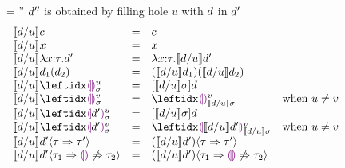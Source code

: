 
\begin{figure}
\small
\judgbox
  { = \dexp''}
  {$d''$ is obtained by filling hole $u$ with $d$ in $d'$}
\[
\begin{array}{lcll}
\instantiate{\dexp}{u}{c}
&=&
c\\
{\instantiate{\dexp}{u}{x}}
&=&
x\\
{\instantiate{\dexp}{u}{\halam{x}{\htau}{\dexp'}}}
&=&
{\halam{x}{\htau}{\instantiate{\dexp}{u}{\dexp'}}}\\
{\instantiate{\dexp}{u}{\dap{d_1}{d_2}}}
&=&
{\dapP{\instantiate{\dexp}{u}{d_1}}{\instantiate{\dexp}{u}{d_2}}}
\\
\instantiate{\dexp}{u}{\dehole{u}{\subst}{}}
&=&
[\instantiate{\dexp}{u}{\subst}]\dexp
\\
\instantiate{\dexp}{u}{\dehole{v}{\subst}{}}
&=&
\dehole{v}{\instantiate{\dexp}{u}{\subst}}{}
& \text{when $u \neq v$}
\\
\instantiate{\dexp}{u}{\dhole{\dexp'}{u}{\subst}{}}
&=&
[\instantiate{\dexp}{u}{\subst}]\dexp
\\
\instantiate{\dexp}{u}{\dhole{\dexp'}{v}{\subst}{}}
&=&
\dhole{\instantiate{\dexp}{u}{\dexp'}}{v}{\instantiate{\dexp}{u}{\subst}}{}
& \text{when $u \neq v$}
\\
%
\instantiate{\dexp}{u}{\dcasttwo{\dexp'}{\htau}{\htau'}}
&=&
\dcasttwo{(\instantiate{\dexp}{u}{\dexp'})}{\htau}{\htau'}
\\
\instantiate{\dexp}{u}{\dcastfail{\dexp'}{\htau_1}{\htau_2}}
&=&
\dcastfail{(\instantiate{\dexp}{u}{\dexp'})}{\htau_1}{\htau_2}
\end{array}
\]
\end{figure}

